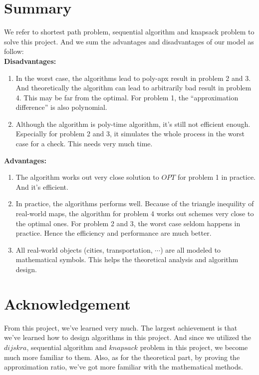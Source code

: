 \documentclass[11pt, a4paper]{article} %
\begin{document}
\section{Summary}
We refer to shortest path problem, sequential algorithm and knapsack problem to solve this project. And we sum the advantages and disadvantages of our model as follow:\\
\textbf{Disadvantages:} 
\begin{enumerate}
	\item In the worst case, the algorithms lead to poly-apx result in problem 2 and 3. And theoretically the algorithm can lead to arbitrarily bad result in problem 4. This may be far from the optimal. For problem 1, the ``approximation difference'' is also polynomial.
	\item Although the algorithm is poly-time algorithm, it's still not efficient enough. Especially for problem 2 and 3, it simulates the whole process in the worst case for a check. This needs very much time.
\end{enumerate}
\textbf{Advantages:}
\begin{enumerate}
	\item The algorithm works out very close solution to $OPT$ for problem 1 in practice. And it's efficient.
	\item In practice, the algorithms performs well. Because of the triangle inequility of real-world maps, the algorithm for problem 4 works out schemes very close to the optimal ones. For problem 2 and 3, the worst case seldom happens in practice. Hence the efficiency and performance are much better.
	\item All real-world objects (cities, transportation, $\cdots$) are all modeled to mathematical symbols. This helps the theoretical analysis and algorithm design.
\end{enumerate}

\newpage %
\section{Acknowledgement}
From this project, we've learned very much. The largest achievement is that we've learned how to design algorithms in this project. And since we utilized the $dijskra$, sequential algorithm and $knapsack$ problem in this project, we become much more familiar to them. Also, as for the theoretical part, by proving the approximation ratio, we've got more familiar with the mathematical methods.
\end{document}
